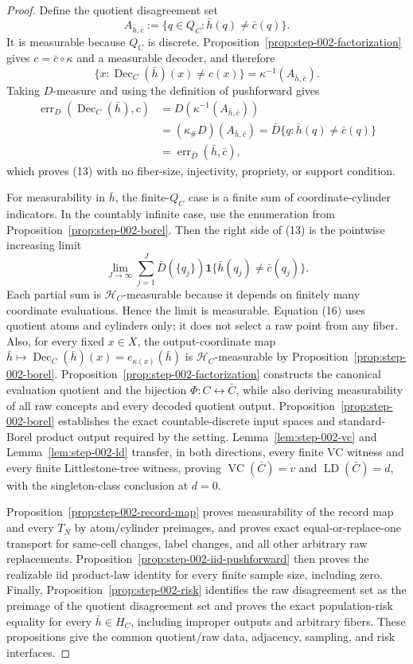 \begin{proof}
Define the quotient disagreement set
\[
A_{\bar h,\bar c}:=\{q\in Q_C:\bar h(q)\ne\bar c(q)\}.
\tag{14}
\]
It is measurable because \(Q_C\) is discrete. Proposition~\ref{prop:step-002-factorization}
gives \(c=\bar c\circ\kappa\) and a measurable decoder, and therefore
\[
\{x:\operatorname{Dec}_C(\bar h)(x)\ne c(x)\}
=\kappa^{-1}(A_{\bar h,\bar c}).
\tag{15}
\]
Taking \(D\)-measure and using the definition of pushforward gives
\[
\begin{aligned}
\operatorname{err}_D(\operatorname{Dec}_C(\bar h),c)
&=D(\kappa^{-1}(A_{\bar h,\bar c}))\\
&=(\kappa_\#D)(A_{\bar h,\bar c})
=\bar D\{q:\bar h(q)\ne\bar c(q)\}\\
&=\operatorname{err}_{\bar D}(\bar h,\bar c),
\end{aligned}
\]
which proves (13) with no fiber-size, injectivity, propriety, or support
condition.

For measurability in \(\bar h\), the finite-\(Q_C\) case is a finite sum of
coordinate-cylinder indicators. In the countably infinite case, use the
enumeration from Proposition~\ref{prop:step-002-borel}. Then the right side
of (13) is the pointwise increasing limit
\[
\lim_{J\to\infty}
\sum_{j=1}^J \bar D(\{q_j\})
\mathbf 1\{\bar h(q_j)\ne\bar c(q_j)\}.
\tag{16}
\]
Each partial sum is \(\mathcal H_C\)-measurable because it depends on finitely
many coordinate evaluations. Hence the limit is measurable. Equation (16)
uses quotient atoms and cylinders only; it does not select a raw point from
any fiber. Also, for every fixed \(x\in X\), the output-coordinate map
\(\bar h\mapsto\operatorname{Dec}_C(\bar h)(x)=e_{\kappa(x)}(\bar h)\) is
\(\mathcal H_C\)-measurable by Proposition~\ref{prop:step-002-borel}.
Proposition~\ref{prop:step-002-factorization} constructs the canonical
evaluation quotient and the bijection \(\Phi:C\leftrightarrow\bar C\), while
also deriving measurability of all raw concepts and every decoded quotient
output. Proposition~\ref{prop:step-002-borel} establishes the exact
countable-discrete input spaces and standard-Borel product output required by
the setting. Lemma~\ref{lem:step-002-vc} and
Lemma~\ref{lem:step-002-ld} transfer, in both directions, every finite VC
witness and every finite Littlestone-tree witness, proving
\(\operatorname{VC}(\bar C)=v\) and \(\operatorname{LD}(\bar C)=d\), with
the singleton-class conclusion at \(d=0\).

Proposition~\ref{prop:step-002-record-map} proves measurability of the record
map and every \(T_N\) by atom/cylinder preimages, and proves exact
equal-or-replace-one transport for same-cell changes, label changes, and all
other arbitrary raw replacements. Proposition~\ref{prop:step-002-iid-pushforward}
then proves the realizable iid product-law identity for every finite sample
size, including zero. Finally, Proposition~\ref{prop:step-002-risk} identifies
the raw disagreement set as the preimage of the quotient disagreement set
and proves the exact population-risk equality for every \(\bar h\in H_C\),
including improper outputs and arbitrary fibers. These propositions give the
common quotient/raw data, adjacency, sampling, and risk interfaces.




\end{proof}
